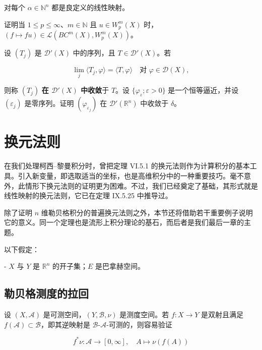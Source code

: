 \begin{exercises}
对每个 $ \alpha \in \mathbb{N}^n $ 都是良定义的线性映射。

\item

证明当 $ 1 \le p \le \infty $、$ m \in \mathbb{N} $ 且 $ u \in W_p^m(X) $ 时，$ (f \mapsto f u) \in \mathcal{L}(BC^m(X), W_p^m(X)) $。

\item

设 $ (T_j) $ 是 $ \mathcal{D}'(X) $ 中的序列，且 $ T \in \mathcal{D}'(X) $。若

\[
\lim_{j} \langle T_j, \varphi \rangle = \langle T, \varphi \rangle \quad \text{对 } \varphi \in \mathcal{D}(X) ,
\]

则称 $ (T_j) $ \textbf{在 $ \mathcal{D}'(X) $ 中收敛}于 $ T $。设 $ \{ \varphi_\varepsilon ; \varepsilon > 0 \} $ 是一个恒等逼近，并设 $ (\varepsilon_j) $ 是零序列。证明 $ (\varphi_{\varepsilon_j}) $ 在 $ \mathcal{D}'(\mathbb{R}^n) $ 中收敛于 $ \delta $。

\end{exercises}

\section{换元法则}

在我们处理柯西–黎曼积分时，曾把定理 VI.5.1 的换元法则作为计算积分的基本工具。引入新变量，即选取适当的坐标，也是高维积分中的一种重要技巧。毫不意外，此情形下换元法则的证明更为困难。不过，我们已经奠定了基础，其形式就是线性映射的换元法则，它已在定理 IX.5.25 中推导过。

除了证明 $ n $ 维勒贝格积分的普遍换元法则之外，本节还将借助若干重要例子说明它的意义。同一个定理也是流形上积分理论的基石，而后者是我们最后一章的主题。

以下假定：

- $ X $ 与 $ Y $ 是 $ \mathbb{R}^{n} $ 的开子集；$ E $ 是巴拿赫空间。

\subsection*{勒贝格测度的拉回}

设 $ (X, \mathcal{A}) $ 是可测空间，$ (Y, \mathcal{B}, \nu) $ 是测度空间。若 $ f : X \to Y $ 是双射且满足 $ f(\mathcal{A}) \subset \mathcal{B} $，即其逆映射是 $ \mathcal{B} $-$ \mathcal{A} $-可测的，则容易验证

\[
f^{*}\nu : \mathcal{A} \to [0, \infty] , \quad A \mapsto \nu(f(A))
\]


